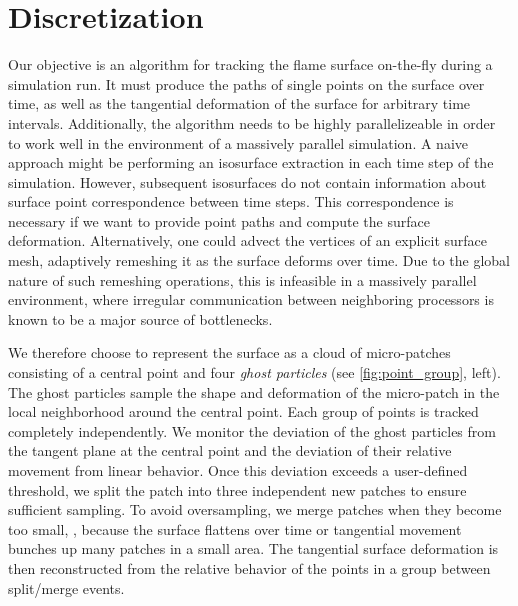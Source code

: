 \section{Discretization} %
\label{sec:fst_discretization}
%
Our objective is an algorithm for tracking the flame surface on-the-fly during
a simulation run.
%
It must produce the paths of single points on the surface over time, as well as
the tangential deformation of the surface for arbitrary time intervals.
%
Additionally, the algorithm needs to be highly parallelizeable in order to work
well in the environment of a massively parallel simulation.
%
A naive approach might be performing an isosurface extraction in each time step
of the simulation.
%
However, subsequent isosurfaces do not contain information about surface point
correspondence between time steps.
%
This correspondence is necessary if we want to provide point paths and compute
the surface deformation.
%
Alternatively, one could advect the vertices of an explicit surface mesh,
adaptively remeshing it as the surface deforms over time.
%
Due to the global nature of such remeshing operations, this is infeasible in a
massively parallel environment, where irregular communication between
neighboring processors is known to be a major source of bottlenecks.
%

%
We therefore choose to represent the surface as a cloud of micro-patches
consisting of a central point and four \textit{ghost particles} (see
\cref{fig:point_group}, left).
%
The ghost particles sample the shape and deformation of the micro-patch in the
local neighborhood around the central point.
%
Each group of points is tracked completely independently.
%
We monitor the deviation of the ghost particles from the tangent plane at the
central point and the deviation of their relative movement from linear behavior.
%
Once this deviation exceeds a user-defined threshold, we split the patch into
three independent new patches to ensure sufficient sampling.
%
To avoid oversampling, we merge patches when they become too small, \eg, because
the surface flattens over time or tangential movement bunches up
many patches in a small area.
%
The tangential surface deformation is then reconstructed from the relative
behavior of the points in a group between split/merge events.
%

%
